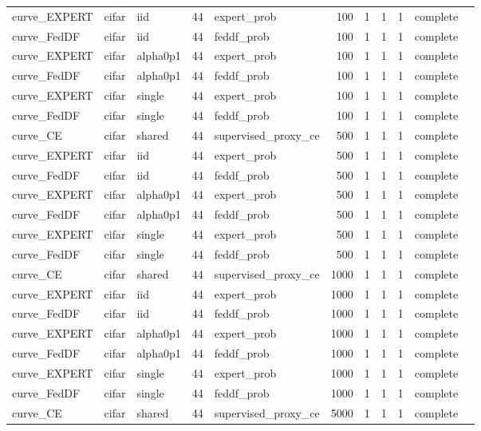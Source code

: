 \begin{tabular}{lllrlrrrrll}
curve\_EXPERT & cifar & iid & 44 & expert\_prob & 100 & 1 & 1 & 1 & complete &  \\
curve\_FedDF & cifar & iid & 44 & feddf\_prob & 100 & 1 & 1 & 1 & complete &  \\
curve\_EXPERT & cifar & alpha0p1 & 44 & expert\_prob & 100 & 1 & 1 & 1 & complete &  \\
curve\_FedDF & cifar & alpha0p1 & 44 & feddf\_prob & 100 & 1 & 1 & 1 & complete &  \\
curve\_EXPERT & cifar & single & 44 & expert\_prob & 100 & 1 & 1 & 1 & complete &  \\
curve\_FedDF & cifar & single & 44 & feddf\_prob & 100 & 1 & 1 & 1 & complete &  \\
curve\_CE & cifar & shared & 44 & supervised\_proxy\_ce & 500 & 1 & 1 & 1 & complete &  \\
curve\_EXPERT & cifar & iid & 44 & expert\_prob & 500 & 1 & 1 & 1 & complete &  \\
curve\_FedDF & cifar & iid & 44 & feddf\_prob & 500 & 1 & 1 & 1 & complete &  \\
curve\_EXPERT & cifar & alpha0p1 & 44 & expert\_prob & 500 & 1 & 1 & 1 & complete &  \\
curve\_FedDF & cifar & alpha0p1 & 44 & feddf\_prob & 500 & 1 & 1 & 1 & complete &  \\
curve\_EXPERT & cifar & single & 44 & expert\_prob & 500 & 1 & 1 & 1 & complete &  \\
curve\_FedDF & cifar & single & 44 & feddf\_prob & 500 & 1 & 1 & 1 & complete &  \\
curve\_CE & cifar & shared & 44 & supervised\_proxy\_ce & 1000 & 1 & 1 & 1 & complete &  \\
curve\_EXPERT & cifar & iid & 44 & expert\_prob & 1000 & 1 & 1 & 1 & complete &  \\
curve\_FedDF & cifar & iid & 44 & feddf\_prob & 1000 & 1 & 1 & 1 & complete &  \\
curve\_EXPERT & cifar & alpha0p1 & 44 & expert\_prob & 1000 & 1 & 1 & 1 & complete &  \\
curve\_FedDF & cifar & alpha0p1 & 44 & feddf\_prob & 1000 & 1 & 1 & 1 & complete &  \\
curve\_EXPERT & cifar & single & 44 & expert\_prob & 1000 & 1 & 1 & 1 & complete &  \\
curve\_FedDF & cifar & single & 44 & feddf\_prob & 1000 & 1 & 1 & 1 & complete &  \\
curve\_CE & cifar & shared & 44 & supervised\_proxy\_ce & 5000 & 1 & 1 & 1 & complete &  \\

\end{tabular}
